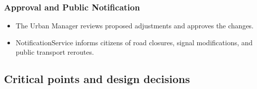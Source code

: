 \documentclass[a4paper,12pt]{article}
\begin{document}
\subsubsection*{Approval and Public Notification}
\begin{itemize}
    \item The Urban Manager reviews proposed adjustments and approves the changes.
    \item NotificationService informs citizens of road closures, signal modifications, and public transport reroutes.
\end{itemize}

\subsection{Critical points and design decisions}
\end{document}
